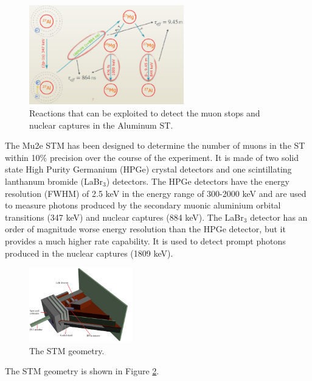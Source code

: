 \begin{figure}[!h]
    \centering
    \includegraphics[width =0.6\textwidth]{figures/png/Screenshot_20240706_094517.png}
    \caption[The muon stops 
    and nuclear captures detection in Al ST.]{Reactions that can be exploited to detect the muon stops 
    and nuclear captures in the Aluminum ST.}
    \label{fig:stmprocess}
    \end{figure}

    The Mu2e STM has been designed to determine the number of 
    muons in the ST within 10\% precision over the course of the experiment.  
    It is made of two solid state High Purity Germanium (HPGe) crystal detectors and one 
    scintillating lanthanum bromide (LaBr$_3$) detectors. The HPGe detectors have the 
    energy resolution (FWHM) of 2.5 keV in the energy range of 300-2000 keV and are used 
    to measure photons produced by the secondary muonic aluminium orbital transitions 
    (347 keV) and nuclear captures (884 keV). The LaBr$_3$ detector has an order of 
    magnitude worse energy resolution than the HPGe detector, but it provides a much 
    higher rate capability. It is used to detect prompt photons produced
    in the nuclear captures (1809 keV).  
    \begin{figure}[!h]
        \centering
        \includegraphics[width =0.4\textwidth]{figures/png/Setup.png}
        \caption[The Stopping Target Monitor geometry.]{The STM geometry.}
        \label{fig:stmfigure}
        \end{figure}
The STM geometry is shown in Figure \ref{fig:stmfigure}.




